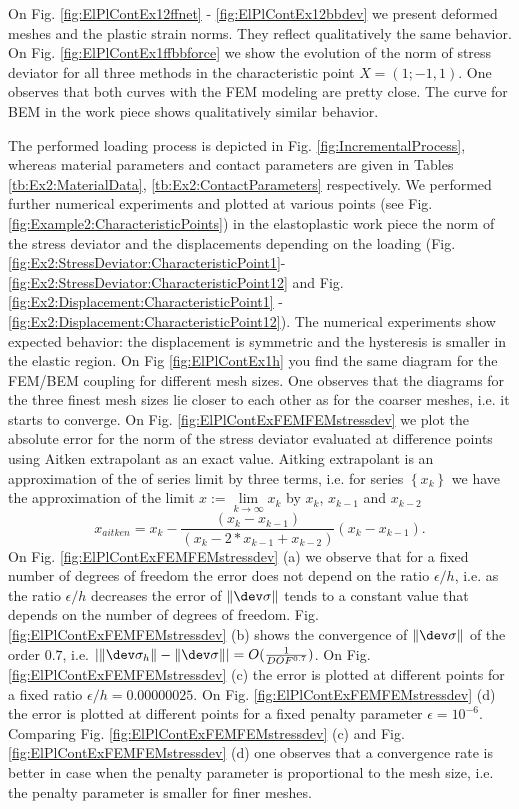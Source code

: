 On Fig. \ref{fig:ElPlContEx12ffnet} - \ref{fig:ElPlContEx12bbdev} we present deformed meshes and the plastic strain norms. They reflect qualitatively the same behavior. On Fig. \ref{fig:ElPlContEx1ffbbforce} we show the evolution of the norm of stress deviator for all three methods in the characteristic point $X = (1;-1,1)$. One observes that both curves with the FEM modeling are pretty close. The curve for BEM in the work piece shows qualitatively similar behavior.

The performed loading process is depicted in Fig. \ref{fig:IncrementalProcess}, whereas material parameters and contact parameters are given in Tables \ref{tb:Ex2:MaterialData}, \ref{tb:Ex2:ContactParameters} respectively. We performed further numerical experiments and plotted at various points (see Fig. \ref{fig:Example2:CharacteristicPoints}) in the elastoplastic work piece the norm of the stress deviator and the displacements  depending on the loading  (Fig. \ref{fig:Ex2:StressDeviator:CharacteristicPoint1}-\ref{fig:Ex2:StressDeviator:CharacteristicPoint12} and Fig. \ref{fig:Ex2:Displacement:CharacteristicPoint1} -  \ref{fig:Ex2:Displacement:CharacteristicPoint12}). The numerical experiments show expected behavior: the displacement is symmetric and the hysteresis is smaller in the elastic region. On Fig \ref{fig:ElPlContEx1h} you find the same diagram for the FEM/BEM coupling for different mesh sizes. One observes that the diagrams for the three finest mesh sizes lie closer to each other as for the coarser meshes, i.e. it starts to converge. On Fig. \ref{fig:ElPlContExFEMFEMstressdev} we plot the absolute error  for the norm of the stress deviator evaluated at difference points using Aitken extrapolant as an exact value. Aitking extrapolant is an approximation of the of series limit by three terms, i.e. for series $\left\lbrace x_k \right\rbrace $ we have the approximation of the limit $x:=\lim\limits_{k\rightarrow \infty} x_k$ by $x_k$, $x_{k-1}$ and  $x_{k-2}$
\begin{equation}\label{eq:AitkenExtrapolant}
x_{aitken}=x_k-\frac{(x_{k}-x_{k-1})}{(x_{k}-2*x_{k-1}+x_{k-2})}(x_{k}-x_{k-1}).
\end{equation}
On Fig. \ref{fig:ElPlContExFEMFEMstressdev} (a) we observe that for a fixed number of degrees of freedom the error does not depend on the ratio $\epsilon/h$, i.e. as the ratio $\epsilon/h$ decreases the error of $\|\dev\sigma\|$ tends to a constant value that depends on the number of degrees of freedom. Fig. \ref{fig:ElPlContExFEMFEMstressdev} (b) shows the convergence of $\|\dev\sigma\|$ of the order $0.7$, i.e. $\left|\|\dev\sigma_h\|-\|\dev\sigma\|\right|=O(\frac{1}{DOF^{0.7}})$. On Fig. \ref{fig:ElPlContExFEMFEMstressdev} (c) the error is plotted at  different points for a fixed ratio $\epsilon/h=0.00000025$. On Fig. \ref{fig:ElPlContExFEMFEMstressdev} (d) the error is plotted at different points for a fixed penalty parameter $\epsilon=10^{-6}$. Comparing Fig. \ref{fig:ElPlContExFEMFEMstressdev} (c)  and Fig. \ref{fig:ElPlContExFEMFEMstressdev} (d) one observes that a convergence rate is better in case when the penalty parameter is proportional to the mesh size, i.e. the penalty parameter  is smaller for finer meshes.

